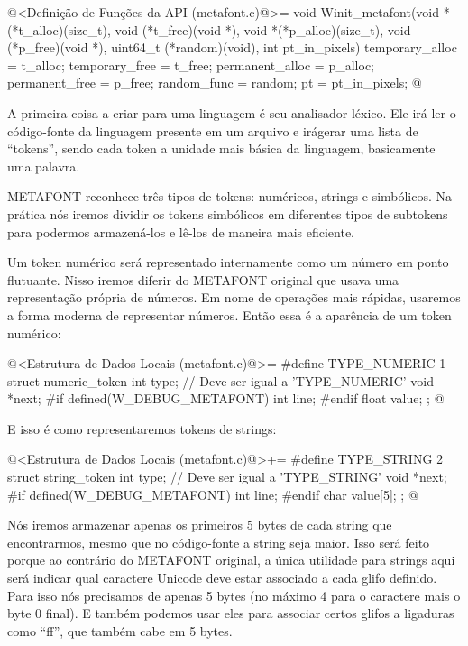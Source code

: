 \iniciocodigo
@<Definição de Funções da API (metafont.c)@>=
void Winit_metafont(void *(*t_alloc)(size_t),
                    void (*t_free)(void *),
                    void *(*p_alloc)(size_t),
                    void (*p_free)(void *),
                    uint64_t (*random)(void), int pt_in_pixels){
  temporary_alloc = t_alloc;
  temporary_free = t_free;
  permanent_alloc = p_alloc;
  permanent_free = p_free;
  random_func = random;
  pt = pt_in_pixels;
}
@
\fimcodigo


A primeira coisa a criar para uma linguagem é seu analisador
léxico. Ele irá ler o código-fonte da linguagem presente em um arquivo
e irágerar uma lista de ``tokens'', sendo cada token a unidade mais
básica da linguagem, basicamente uma palavra.

METAFONT reconhece três tipos de tokens: numéricos, strings e
simbólicos. Na prática nós iremos dividir os tokens simbólicos em
diferentes tipos de subtokens para podermos armazená-los e lê-los de
maneira mais eficiente.

Um token numérico será representado internamente como um número em
ponto flutuante. Nisso iremos diferir do METAFONT original que usava
uma representação própria de números. Em nome de operações mais
rápidas, usaremos a forma moderna de representar números. Então essa é
a aparência de um token numérico:

\iniciocodigo
@<Estrutura de Dados Locais (metafont.c)@>=
#define TYPE_NUMERIC 1
struct numeric_token{
  int type;   // Deve ser igual a 'TYPE_NUMERIC'
  void *next;
#if defined(W_DEBUG_METAFONT)
  int line;
#endif
  float value;
};
@
\fimcodigo

E isso é como representaremos tokens de strings:

\iniciocodigo
@<Estrutura de Dados Locais (metafont.c)@>+=
#define TYPE_STRING 2
struct string_token{
  int type;   // Deve ser igual a 'TYPE_STRING'
  void *next;
#if defined(W_DEBUG_METAFONT)
  int line;
#endif
  char value[5];
};
@
\fimcodigo

Nós iremos armazenar apenas os primeiros 5 bytes de cada string que
encontrarmos, mesmo que no código-fonte a string seja maior. Isso será
feito porque ao contrário do METAFONT original, a única utilidade para
strings aqui será indicar qual caractere Unicode deve estar associado
a cada glifo definido. Para isso nós precisamos de apenas 5 bytes (no
máximo 4 para o caractere mais o byte 0 final). E também podemos usar
eles para associar certos glifos a ligaduras como ``ff'', que também
cabe em 5 bytes.

